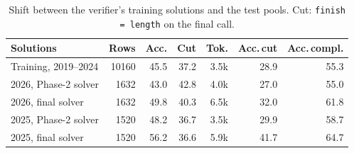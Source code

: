 \begin{table}[!t]
\centering
\scriptsize
\caption{Shift between the verifier's training solutions and the test pools. Cut: \texttt{finish = length} on the final call.}
\label{tab:shift}
\setlength{\tabcolsep}{2.5pt}
\begin{tabular}{lrrrrrr}
\toprule
Solutions & Rows & Acc. & Cut & Tok. & Acc.\,cut & Acc.\,compl. \\
\midrule
Training, 2019--2024 & 10160 & 45.5 & 37.2 & 3.5k & 28.9 & 55.3 \\
2026, Phase-2 solver & 1632 & 43.0 & 42.8 & 4.0k & 27.0 & 55.0 \\
2026, final solver & 1632 & 49.8 & 40.3 & 6.5k & 32.0 & 61.8 \\
2025, Phase-2 solver & 1520 & 48.2 & 36.7 & 3.5k & 29.9 & 58.7 \\
2025, final solver & 1520 & 56.2 & 36.6 & 5.9k & 41.7 & 64.7 \\
\bottomrule
\end{tabular}
\end{table}
